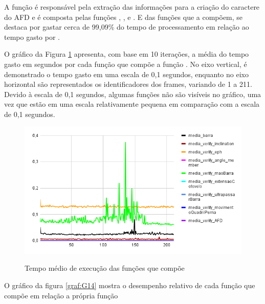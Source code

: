 A função  é responsável pela extração das informações para a criação do caractere do AFD e é composta pelas funções , ,  e . E das funções que a compõem,  se destaca por gastar cerca de 99,09\% do tempo de processamento em relação ao tempo gasto por .


O gráfico da Figura \ref{graf:G13} apresenta, com base em 10 iterações, a média do tempo gasto em segundos por cada função que compõe a função . No eixo vertical, é demonstrado o tempo gasto em uma escala de 0,1 segundos, enquanto no eixo horizontal são representados os identificadores dos frames, variando de 1 a 211. Devido à escala de 0,1 segundos, algumas funções não são visíveis no gráfico, uma vez que estão em uma escala relativamente pequena em comparação com a escala de 0,1 segundos.

\begin{figure}[H]
	\centering
	\caption{Tempo médio de execução das funções que compõe }
	\includegraphics[scale=0.7]{figuras/grafico/comp_process_cell_2.png}
	\label{graf:G13}
\end{figure}


O gráfico da figura \ref{graf:G14} mostra o desempenho relativo de cada função que compõe  em relação a própria função 

